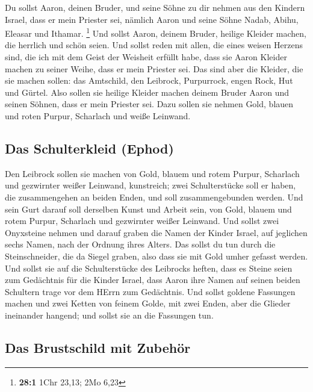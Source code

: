  Du sollst Aaron, deinen Bruder, und seine Söhne zu dir
nehmen aus den Kindern Israel, dass er mein Priester sei, nämlich Aaron
und seine Söhne Nadab, Abihu, Eleasar und Ithamar. \footnote{\textbf{28:1}
  1Chr 23,13; 2Mo 6,23}  Und sollst Aaron, deinem Bruder,
heilige Kleider machen, die herrlich und schön seien.  Und
sollst reden mit allen, die eines weisen Herzens sind, die ich mit dem
Geist der Weisheit erfüllt habe, dass sie Aaron Kleider machen zu seiner
Weihe, dass er mein Priester sei.  Das sind aber die
Kleider, die sie machen sollen: das Amtschild, den Leibrock, Purpurrock,
engen Rock, Hut und Gürtel. Also sollen sie heilige Kleider machen
deinem Bruder Aaron und seinen Söhnen, dass er mein Priester sei.
 Dazu sollen sie nehmen Gold, blauen und roten Purpur,
Scharlach und weiße Leinwand.

\hypertarget{das-schulterkleid-ephod}{%
\subsection{Das Schulterkleid (Ephod)}\label{das-schulterkleid-ephod}}

 Den Leibrock sollen sie machen von Gold, blauem und rotem
Purpur, Scharlach und gezwirnter weißer Leinwand, kunstreich;
 zwei Schulterstücke soll er haben, die zusammengehen an
beiden Enden, und soll zusammengebunden werden.  Und sein
Gurt darauf soll derselben Kunst und Arbeit sein, von Gold, blauem und
rotem Purpur, Scharlach und gezwirnter weißer Leinwand. 
Und sollst zwei Onyxsteine nehmen und darauf graben die Namen der Kinder
Israel,  auf jeglichen sechs Namen, nach der Ordnung
ihres Alters.  Das sollst du tun durch die
Steinschneider, die da Siegel graben, also dass sie mit Gold umher
gefasst werden.  Und sollst sie auf die Schulterstücke
des Leibrocks heften, dass es Steine seien zum Gedächtnis für die Kinder
Israel, dass Aaron ihre Namen auf seinen beiden Schultern trage vor dem
HErrn zum Gedächtnis.  Und sollst goldene Fassungen
machen  und zwei Ketten von feinem Golde, mit zwei Enden,
aber die Glieder ineinander hangend; und sollst sie an die Fassungen
tun.

\hypertarget{das-brustschild-mit-zubehuxf6r}{%
\subsection{Das Brustschild mit
Zubehör}\label{das-brustschild-mit-zubehuxf6r}}

